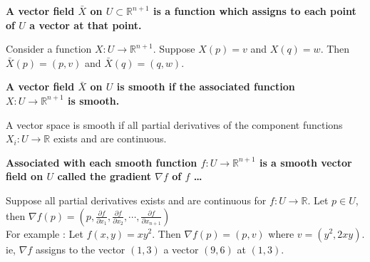 \documentclass[a4paper,12pt,openany]{book}
\begin{document}
\textbf{\phantom{}}
\textbf{A vector field $\bar{X}$ on $U \subset \mathbb{R}^{n+1}$ is a function which assigns to each point of $U$ a vector at that point.}\\
\begin{story}
	Consider a function $X : U \to \mathbb{R}^{n+1}$.
	Suppose $X(p) = v$ and $X(q) = w$.
	Then $\bar{X}(p) = (p,v)$ and $\bar{X}(q) = (q,w)$.
\end{story}

\textbf{\phantom{}}
\textbf{A vector field $\bar{X}$ on $U$ is smooth if the associated function\\ $X : U \to \mathbb{R}^{n+1}$ is smooth.}\\
\begin{story}
	A vector space is smooth if all partial derivatives of the component functions $X_i : U \to \mathbb{R}$ exists and are continuous.
\end{story}

\textbf{\phantom{}}
\textbf{Associated with each smooth function $f : U \to \mathbb{R}^{n+1}$ is a smooth vector field on $U$ called the gradient $\nabla f$ of $f$ \dots}\\
\begin{story}
	Suppose all partial derivatives exists and are continuous for $f : U \to \mathbb{R}$.
	Let $p \in U$, then $\nabla f(p) = (p,\frac{\partial f}{\partial x_1},\frac{\partial f}{\partial x_2},\cdots,\frac{\partial f}{\partial x_{n+1}})$\\
	For example : Let $f(x,y) = xy^2$. Then $\nabla f(p) = (p,v)$ where $v = (y^2,2xy)$.\\
	ie, $\nabla f$ assigns to the vector $(1,3)$ a vector $(9,6)$ at $(1,3)$.
\end{story}

%


\end{document}

